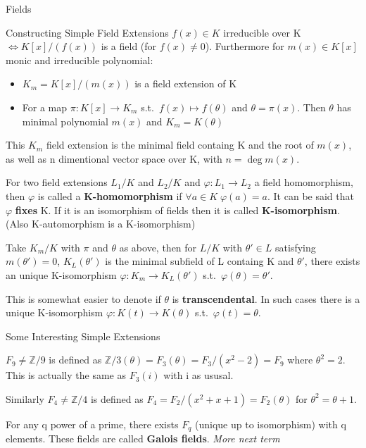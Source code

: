 \documentclass[12pt, letterpaper]{article}
\newcommand{\Z}{\mathbb{Z}}
\begin{document}
\begin{section}{Fields}
\begin{subsection}{Constructing Simple Field Extensions}
    \(f(x) \in K\) irreducible over K \(\iff K[x]/(f(x))\) is a field (for
    \(f(x) \neq 0\)). Furthermore for \(m(x) \in K[x]\) monic and irreducible
    polynomial:
    \begin{itemize}
      \item \(K_{m} = K[x] / (m(x))\) is a field extension of K
      \item For a map \(\pi : K[x] \to K_{m}\) s.t.\ \(f(x) \mapsto f(\theta)\)
            and \(\theta = \pi(x)\). Then \(\theta\) has minimal polynomial
            \(m(x)\) and \(K_{m} = K(\theta)\)
    \end{itemize}
    This \(K_{m}\) field extension is the minimal field containg K and the root
    of \(m(x)\), as well as n dimentional vector space over K, with \(n =
    \deg m(x)\).

    For two field extensions \(L_{1} / K\) and \(L_{2} / K\) and \(\varphi:
    L_{1} \to L_{2}\) a field homomorphism, then \(\varphi\) is called a
    \textbf{K-homomorphism} if \(\forall a \in K \; \varphi(a) = a\). It can
    be said that \(\varphi\) \textbf{fixes} K. If it is an isomorphism of fields
    then it is called \textbf{K-isomorphism}. (Also K-automorphism is a
    K-isomorphism)

    Take \(K_{m} / K\) with \(\pi\) and \(\theta\) as above, then for \(L / K\)
    with \(\theta' \in L\) satisfying \(m(\theta') = 0\), \(K_{L}(\theta')\) is
    the minimal subfield of L containg K and \(\theta'\), there exists an
    unique K-isomorphism \(\varphi: K_{m} \to K_{L}(\theta')\) s.t.\
    \(\varphi(\theta) = \theta'\).

    This is somewhat easier to denote if \(\theta\) is \textbf{transcendental}.
    In such cases there is a unique K-isomorphism \(\varphi: K(t) \to
    K(\theta)\) s.t.\ \(\varphi(t) = \theta\).

  \end{subsection}

  \begin{subsection}{Some Interesting Simple Extensions}

    \(F_{9} \neq \Z / 9\) is defined as \(\Z / 3 (\theta)
    = F_{3}(\theta) = F_{3} / (x^{2} - 2) = F_{9}\) where \(\theta^{2} = 2\).
    This is actually the same as \(F_{3}(i)\) with i as ususal.

    Similarly \(F_{4} \neq \Z / 4\) is defined as
    \(F_{4} = F_{2} / (x^{2} + x + 1) = F_{2}(\theta)\) for \(\theta^{2} =
    \theta + 1\).

    For any q power of a prime, there exists \(F_{q}\) (unique up to
    isomorphism) with q elements. These fields are called \textbf{Galois
      fields}. \textit{More next term}


\end{subsection}
\end{section}
\end{document}
